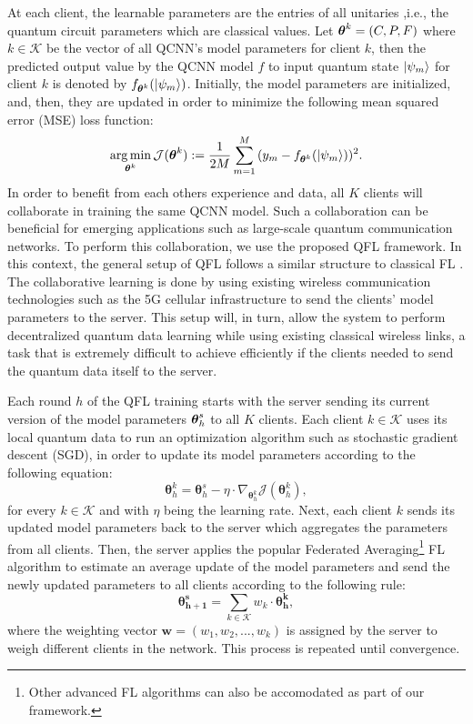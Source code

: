 \documentclass{article}
\DeclareMathOperator*{\argmin}{arg\,min}
\begin{document}
At each client, the learnable parameters are the entries of all unitaries ,i.e., the quantum circuit parameters which are classical values. Let $\text{\boldmath$\theta$}^k = (C,P,F)$ where $k\in\mathcal{K}$ be the vector of all QCNN's model parameters for client $k$, then the predicted output value by the QCNN model $f$ to input quantum state $\ket{\psi_m}$ for client $k$ is denoted by $f_{\text{\boldmath$\theta$}^k}(\ket{\psi_m})$. Initially, the model parameters are initialized, and, then, they are updated in order to minimize the following mean squared error (MSE) loss function:
\begin{equation}
\argmin_{\boldsymbol{\theta}^k} \mathcal{J}(\boldsymbol{\theta}^k) := \frac{1}{2M} \sum_{m=1}^{M}{(y_m - f_{\boldsymbol{\theta}^k}(\ket{\psi_m}))^2}.
\end{equation} 
In order to benefit from each others experience and data, all $K$ clients will collaborate in training the same QCNN model. Such a collaboration can be beneficial for emerging applications such as large-scale quantum communication networks. To perform this collaboration, we use the proposed QFL framework. In this context, the general setup of QFL follows a similar structure to classical FL \cite{yu2020federated_icml}. The collaborative learning is done by using existing wireless communication technologies such as the 5G cellular infrastructure to send the clients'  model parameters to the server. This setup will, in turn, allow the system to perform decentralized quantum data learning while using existing classical wireless links, a task that is extremely difficult to achieve efficiently if the clients needed to send the quantum data itself to the server. 

Each round $h$ of the QFL training starts with the server sending its current version of the model parameters $\text{\boldmath$\theta$}_h^s$ to all $K$ clients. Each client $k \in \mathcal{K}$ uses its local quantum data to run an optimization algorithm such as stochastic gradient descent (SGD), in order to update its model parameters according to the following equation:
\begin{equation}
    \boldsymbol{\theta}_h^k = \boldsymbol{\theta}_h^s - \eta\cdot\nabla_{\boldsymbol{\theta}_h^k} \mathcal{J}(\boldsymbol{\theta}_h^k), 
\end{equation}
for every $k\in \mathcal{K}$ and  with $\eta$ being the learning rate.
Next, each client $k$ sends its updated model parameters back to the server which aggregates the parameters from all clients. Then, the server applies the popular Federated Averaging\footnote{Other advanced FL algorithms can also be accomodated as part of our framework.} FL algorithm \cite{FedAvg} to estimate an average update of the model parameters and send the newly updated parameters to all clients according to the following rule:
\begin{equation}
    \boldsymbol{\theta_{h+1}^s} = \sum_{k\in \mathcal{K}}{w_k\cdot\boldsymbol{\theta_h^k}},   
\end{equation}
where the weighting vector $\boldsymbol{w} = (w_1, w_2,...,w_k)$ is assigned by the server to weigh different clients in the network. This process is repeated until convergence. 
\end{document}
